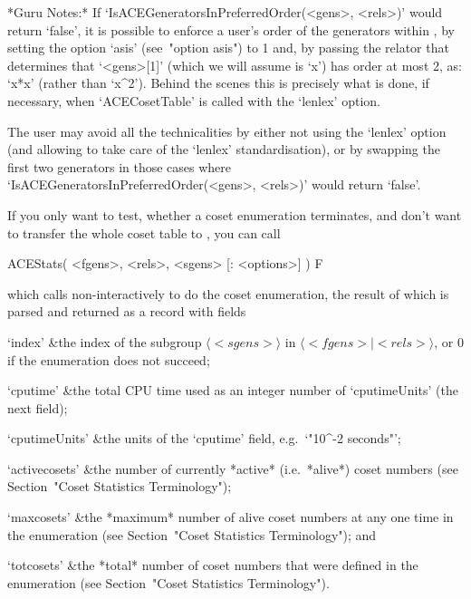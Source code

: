 *Guru Notes:*
If  `IsACEGeneratorsInPreferredOrder(<gens>,  <rels>)'  would   return
`false', it is possible to enforce a user's order  of  the  generators
within {\ACE}, by setting the option `asis' (see~"option asis")  to  1
and, by passing the relator that determines that `<gens>[1]' (which we
will assume is `x') has order  at  most  2,  as:  `x*x'  (rather  than
`x^2').  Behind  the  scenes  this  is  precisely  what  is  done,  if
necessary, when `ACECosetTable' is called with the `lenlex' option.

The user may avoid all the technicalities  by  either  not  using  the
`lenlex' option (and allowing {\GAP} to  take  care  of  the  `lenlex'
standardisation), or by swapping the first  two  generators  in  those
cases where  `IsACEGeneratorsInPreferredOrder(<gens>,  <rels>)'  would
return `false'.


If you only want to  test, whether a coset enumeration terminates, and
don't want to  transfer the whole coset table  to {\GAP}, you can call

\>ACEStats( <fgens>, <rels>, <sgens> [: <options>] ) F

which calls {\ACE} non-interactively to do the coset enumeration,  the
result of which is parsed and returned as a {\GAP} record with fields

\beginitems

\quad`index' &the index of the subgroup $\langle <sgens>  \rangle$  in
$\langle <fgens> \mid <rels> \rangle$, or $0$ if the enumeration  does
not succeed;

\quad`cputime' &the total CPU  time  used  as  an  integer  number  of
`cputimeUnits' (the next field);

\quad`cputimeUnits' &the units of the  `cputime'  field,  e.g.~`"10^-2
seconds"';

\quad`activecosets' &the number of currently  *active*  (i.e.~*alive*)
coset numbers (see Section~"Coset Statistics Terminology");

\quad`maxcosets' &the *maximum* number of alive coset numbers  at  any
one  time  in   the   enumeration   (see   Section~"Coset   Statistics
Terminology"); and

\quad`totcosets' &the  *total*  number  of  coset  numbers  that  were
defined   in   the   enumeration   (see   Section~"Coset    Statistics
Terminology").

